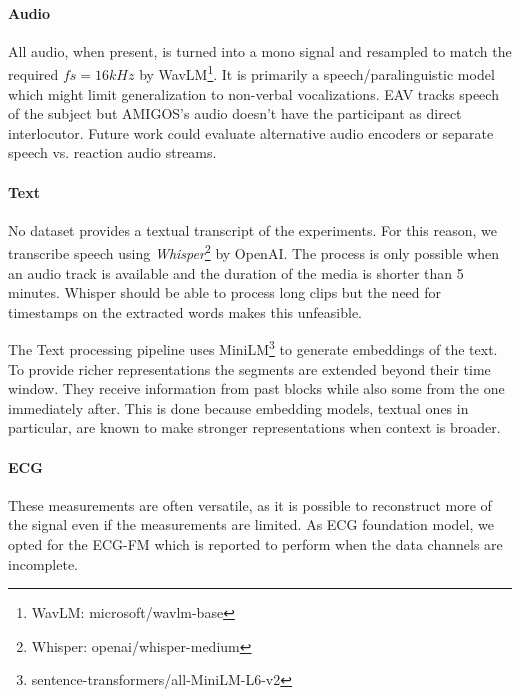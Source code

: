 \paragraph{Audio}
All audio, when present, is turned into a mono signal and resampled to match the required $fs=16kHz$ by WavLM\footnote{WavLM: microsoft/wavlm-base}\cite{Chen_2022}.
It is primarily a speech/paralinguistic model which might limit generalization to non-verbal vocalizations.
EAV tracks speech of the subject but AMIGOS's audio doesn't have the participant as direct interlocutor.
Future work could evaluate alternative audio encoders or separate speech vs. reaction audio streams.

\paragraph{Text}
No dataset provides a textual transcript of the experiments.
For this reason, we transcribe speech using \textit{Whisper}\footnote{Whisper: openai/whisper-medium} by OpenAI\cite{radford2022robustspeechrecognitionlargescale}.
The process is only possible when an audio track is available and the duration of the media is shorter than 5 minutes.
Whisper should be able to process long clips but the need for timestamps on the extracted words makes this unfeasible.

The Text processing pipeline uses MiniLM\footnote{sentence-transformers/all-MiniLM-L6-v2}\cite{wang2020minilmdeepselfattentiondistillation}
to generate embeddings of the text.
To provide richer representations the segments are extended beyond their time window.
They receive information from past blocks while also some from the one immediately after.
This is done because embedding models, textual ones in particular, are known to make stronger representations when context is broader.

\paragraph{ECG}
These measurements are often versatile, as it is possible to reconstruct more of the signal even if the measurements are limited.
As ECG foundation model, we opted for the ECG-FM\cite{mckeen2025ecgfmopenelectrocardiogramfoundation} which is reported to perform when the data channels are incomplete.

